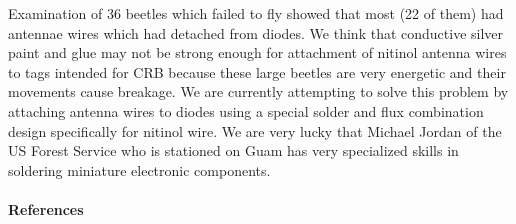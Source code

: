 \begin{refsection}
Examination of 36 beetles which failed to fly showed that most (22 of them) had antennae wires which had detached from diodes. We think that conductive silver paint and glue may not be strong enough for attachment of nitinol antenna wires to tags intended for CRB because these large beetles are very energetic and their movements cause breakage. We are currently attempting to solve this problem by attaching antenna wires to diodes using a special solder and flux combination design specifically for nitinol wire. We are very lucky that Michael Jordan of the US Forest Service who is stationed on Guam has very specialized skills in soldering miniature electronic components.
			
%		
%
%
%
%


\paragraph{References}
\printbibliography[heading=none]

\end{refsection}


